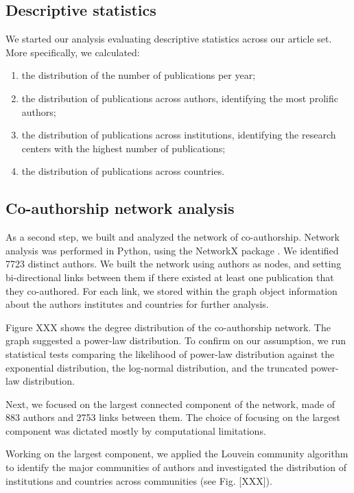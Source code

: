 \documentclass[a4paper, review, endfloat, authoryear]{elsarticle}
\begin{document}
	\subsection{Descriptive statistics}
	We started our analysis evaluating descriptive statistics across our article set. More specifically, we calculated:
	\begin{enumerate}
		\item the distribution of the number of publications per year;
		\item the distribution of publications across authors, identifying the most prolific authors;
		\item the distribution of publications across institutions, identifying the research centers with the highest number of publications;
		\item the distribution of publications across countries.
	\end{enumerate}
	
	\subsection{Co-authorship network analysis}
	As a second step, we built and analyzed the network of co-authorship. Network analysis was performed in Python, using the NetworkX package \citep{hagberg2008exploring}. We identified 7723 distinct authors. We built the network using authors as nodes, and setting bi-directional links between them if there existed at least one publication that they co-authored. For each link, we stored within the graph object information about the authors institutes and countries for further analysis.
	
	Figure XXX shows the degree distribution of the co-authorship network. The graph suggested a power-law distribution. To confirm on our assumption, we run statistical tests comparing the likelihood of power-law distribution against the exponential distribution, the log-normal distribution, and the truncated power-law distribution.
	
	Next, we focused on the largest connected component of the network, made of 883 authors and 2753 links between them. The choice of focusing on the largest component was dictated mostly by computational limitations.
	
	Working on the largest component, we applied the Louvein community \citep{blondel2008fast} algorithm to identify the major communities of authors and investigated the distribution of institutions and countries across communities (see Fig. [XXX]).
	
\end{document}
